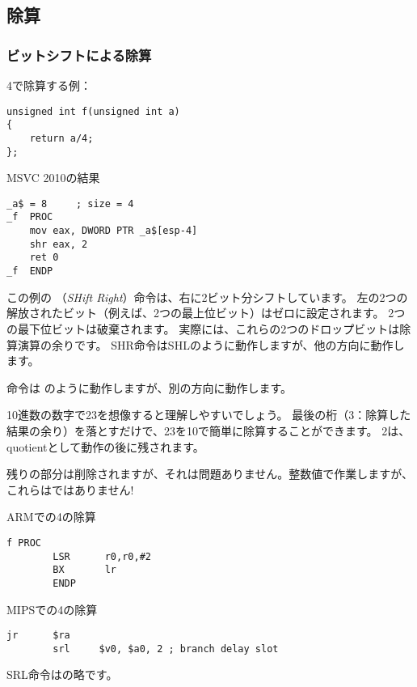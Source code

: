 ﻿\subsection{除算}

\subsubsection{ビットシフトによる除算}
\label{division_by_shifting}

4で除算する例：

\begin{lstlisting}[style=customc]
unsigned int f(unsigned int a)
{
	return a/4;
};
\end{lstlisting}

MSVC 2010の結果

\begin{lstlisting}[caption=MSVC 2010,style=customasmx86]
_a$ = 8		; size = 4
_f	PROC
	mov	eax, DWORD PTR _a$[esp-4]
	shr	eax, 2
	ret	0
_f	ENDP
\end{lstlisting}

\label{SHR}

この例の \SHR （\emph{SHift Right}）命令は、右に2ビット分シフトしています。 
左の2つの解放されたビット（例えば、2つの最上位ビット）はゼロに設定されます。
2つの最下位ビットは破棄されます。 
実際には、これらの2つのドロップビットは除算演算の余りです。
SHR命令はSHLのように動作しますが、他の方向に動作します。


\SHR 命令は \SHL のように動作しますが、別の方向に動作します。



10進数の数字で23を想像すると理解しやすいでしょう。
最後の桁（3：除算した結果の余り）を落とすだけで、23を10で簡単に除算することができます。
2は、\gls{quotient}として動作の後に残されます。

残りの部分は削除されますが、それは問題ありません。整数値で作業しますが、
これらはではありません!

ARMでの4の除算

\begin{lstlisting}[caption=\NonOptimizingKeilVI (\ARMMode),style=customasmARM]
f PROC
        LSR      r0,r0,#2
        BX       lr
        ENDP
\end{lstlisting}

MIPSでの4の除算

\begin{lstlisting}[caption=\Optimizing GCC 4.4.5 (IDA),style=customasmMIPS]
        jr      $ra
        srl     $v0, $a0, 2 ; branch delay slot
\end{lstlisting}

SRL命令はの略です。
